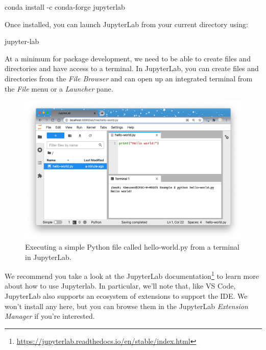 \documentclass[
]{krantz}
\makeatletter
\newenvironment{Shaded}{\begin{snugshade}}{\end{snugshade}}
\newcommand{\ExtensionTok}[1]{#1}
\newcommand{\NormalTok}[1]{#1}
\renewcommand{\href}[2]{#2\footnote{\url{#1}}}
\newenvironment{kframe}{%
\medskip{}
\setlength{\fboxsep}{.8em}
 \def\at@end@of@kframe{}%
 \ifinner\ifhmode%
  \def\at@end@of@kframe{\end{minipage}}%
  \begin{minipage}{\columnwidth}%
 \fi\fi%
 \def\FrameCommand##1{\hskip\@totalleftmargin \hskip-\fboxsep
 \colorbox{shadecolor}{##1}\hskip-\fboxsep
     \hskip-\linewidth \hskip-\@totalleftmargin \hskip\columnwidth}%
 \MakeFramed {\advance\hsize-\width
   \@totalleftmargin\z@ \linewidth\hsize
   \@setminipage}}%
 {\par\unskip\endMakeFramed%
 \at@end@of@kframe}
\renewenvironment{Shaded}{\begin{kframe}}{\end{kframe}}
\makeatother
\begin{document}
\begin{Shaded}
\begin{Highlighting}[]
\ExtensionTok{conda}\NormalTok{ install {-}c conda{-}forge jupyterlab}
\end{Highlighting}
\end{Shaded}

Once installed, you can launch JupyterLab from your current directory using:

\begin{Shaded}
\begin{Highlighting}[]
\ExtensionTok{jupyter{-}lab}
\end{Highlighting}
\end{Shaded}

At a minimum for package development, we need to be able to create files and directories and have access to a terminal. In JupyterLab, you can create files and directories from the \emph{File Browser} and can open up an integrated terminal from the \emph{File} menu or a \emph{Launcher} pane.

\begin{figure}

{\centering \includegraphics[width=1\linewidth]{../images/jupyterlab} 

}

\caption{Executing a simple Python file called hello-world.py from a terminal in JupyterLab.}\label{fig:02-jupyterlab}
\end{figure}

We recommend you take a look at the JupyterLab \href{https://jupyterlab.readthedocs.io/en/stable/index.html}{documentation} to learn more about how to use Jupyterlab. In particular, we'll note that, like VS Code, JupyterLab also supports an ecosystem of extensions to support the IDE. We won't install any here, but you can browse them in the JupyterLab \emph{Extension Manager} if you're interested.
\end{document}
